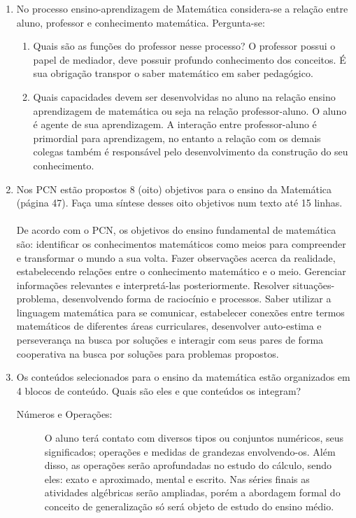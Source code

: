 \documentclass[a4paper, 12pt]{article}
\begin{document}
\begin{enumerate}
\item No processo ensino-aprendizagem de Matemática considera-se a relação entre aluno, professor e conhecimento matemática. Pergunta-se: 
  \begin{enumerate}
  \item Quais são as funções do professor nesse processo?
    O professor possui o papel de mediador, deve possuir profundo conhecimento dos conceitos. É sua obrigação transpor o saber matemático em saber pedagógico.
   \item Quais capacidades devem ser desenvolvidas no aluno na relação ensino aprendizagem de matemática ou seja na relação professor-aluno. 
    O aluno é agente de sua aprendizagem. A interação entre professor-aluno é primordial para aprendizagem, no entanto a relação com os demais colegas também é responsável pelo desenvolvimento da construção do seu conhecimento.
  \end{enumerate}
\item Nos PCN estão propostos 8 (oito) objetivos para o ensino da Matemática (página 47). Faça uma síntese desses oito objetivos num texto até 15 linhas. \\ \\
 De acordo com o PCN, os objetivos do ensino fundamental de matemática são: identificar os conhecimentos matemáticos como meios para compreender e transformar o mundo a sua volta. Fazer observações acerca da realidade, estabelecendo relações entre o conhecimento matemático e o meio. Gerenciar informações relevantes e interpretá-las posteriormente. Resolver situações-problema, desenvolvendo forma de raciocínio e processos. Saber utilizar a linguagem matemática para se comunicar, estabelecer conexões entre termos matemáticos de diferentes áreas curriculares, desenvolver auto-estima e perseverança na busca por soluções e interagir com seus pares de forma cooperativa na busca por soluções para problemas propostos.
 \item Os conteúdos selecionados para o ensino da matemática estão organizados em 4 blocos de conteúdo. Quais são eles e que conteúdos os integram? 
   \begin{description}
   \item[Números e Operações:] O aluno terá contato com diversos tipos ou conjuntos numéricos, seus significados; operações e medidas de grandezas envolvendo-os. Além disso, as operações serão aprofundadas no estudo do cálculo, sendo eles: exato e aproximado, mental e escrito. Nas séries finais as atividades algébricas serão ampliadas, porém a abordagem formal do conceito de generalização só será objeto de estudo do ensino médio.

\end{description}
\end{enumerate}
\end{document}
